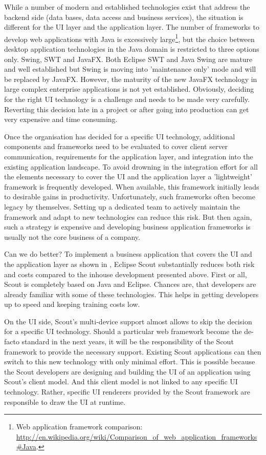 \documentclass[a4paper,10pt,twoside]{book}
\begin{document}
While a number of modern and established technologies exist that address the backend side (data bases, data access and business services), the situation is different for the UI layer and the application layer. 
The number of frameworks to develop web applications with Java is excessively large\footnote{
Web application framework comparison: \url{http://en.wikipedia.org/wiki/Comparison_of_web_application_frameworks#Java}.
},
but the choice between desktop application technologies in the Java domain is restricted to three options only. 
Swing, SWT and JavaFX.
Both Eclipse SWT and Java Swing are mature and well established but Swing is moving into 'maintenance only' mode and will be replaced by JavaFX.
However, the maturity of the new JavaFX technology in large complex enterprise applications is not yet established. 
Obviously, deciding for the right UI technology is a challenge and needs to be made very carefully. 
Reverting this decision late in a project or after going into production can get very expensive and time consuming. 

Once the organisation has decided for a specific UI technology, additional components and frameworks need to be evaluated to cover client server communication, requirements for the application layer, and integration into the existing application landscape. 
To avoid drowning in the integration effort for all the elements necessary to cover the UI and the application layer a 'lightweight' framework is frequently developed. 
When available, this framework initially leads to desirable gains in productivity. 
Unfortunately, such frameworks often become legacy by themselves. 
Setting up a dedicated team to actively maintain the framework and adapt to new technologies can reduce this risk. 
But then again, such a strategy is expensive and developing business application frameworks is usually not the core business of a company. 

Can we do better? 
To implement a business application that covers the UI and the application layer as shown in , Eclipse Scout substantially reduces both risk and costs compared to the inhouse development presented above.
First or all, Scout is completely based on Java and Eclipse. 
Chances are, that developers are already familiar with some of these technologies.
This helps in getting developers up to speed and keeping training costs low. 

On the UI side, Scout's multi-device support almost allows to skip the decision for a specific UI technology. 
Should a particular web framework become the de-facto standard in the next years, it will be the responsibility of the Scout framework to provide the necessary support. 
Existing Scout applications can then switch to this new technology with only minimal effort. 
This is possible because the Scout developers are designing and building the UI of an application using Scout's client model.
And this client model is not linked to any specific UI technology. 
Rather, specific UI renderers provided by the Scout framework are responsible to draw the UI at runtime. 
\end{document}
